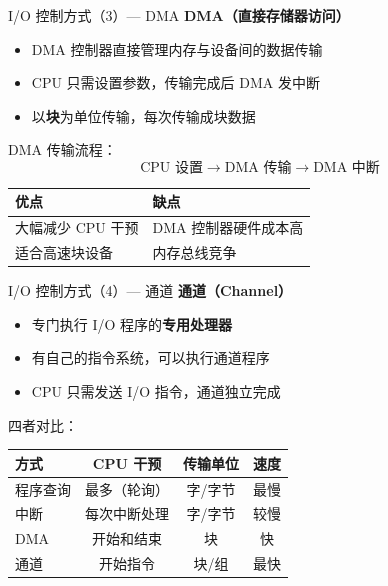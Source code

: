 \documentclass[10pt, aspectratio=169]{beamer}
\begin{document}
\begin{frame}{I/O 控制方式（3）--- DMA}
    \textbf{DMA（直接存储器访问）}
    \begin{itemize}
        \item DMA 控制器直接管理内存与设备间的数据传输
        \item CPU 只需设置参数，传输完成后 DMA 发中断
        \item 以\textbf{块}为单位传输，每次传输成块数据
    \end{itemize}
    \vspace{0.5em}
    DMA 传输流程：
    \[
    \text{CPU 设置} \rightarrow \text{DMA 传输} \rightarrow \text{DMA 中断}
    \]
    \vspace{0.5em}
    \begin{center}
        \begin{tabular}{|l|l|}
            \hline
            \textbf{优点} & \textbf{缺点} \\
            \hline
            大幅减少 CPU 干预 & DMA 控制器硬件成本高 \\
            适合高速块设备 & 内存总线竞争 \\
            \hline
        \end{tabular}
    \end{center}
\end{frame}

\begin{frame}{I/O 控制方式（4）--- 通道}
    \textbf{通道（Channel）}
    \begin{itemize}
        \item 专门执行 I/O 程序的\textbf{专用处理器}
        \item 有自己的指令系统，可以执行通道程序
        \item CPU 只需发送 I/O 指令，通道独立完成
    \end{itemize}
    \vspace{0.5em}
    四者对比：
    \begin{center}
        \begin{tabular}{|l|c|c|c|}
            \hline
            \textbf{方式} & \textbf{CPU 干预} & \textbf{传输单位} & \textbf{速度} \\
            \hline
            程序查询 & 最多（轮询） & 字/字节 & 最慢 \\
            中断 & 每次中断处理 & 字/字节 & 较慢 \\
            DMA & 开始和结束 & 块 & 快 \\
            通道 & 开始指令 & 块/组 & 最快 \\
            \hline
        \end{tabular}
    \end{center}
\end{frame}
\end{document}
